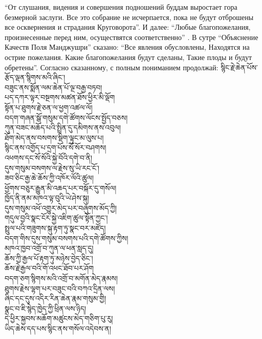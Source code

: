 “От слушания, видения и совершения подношений буддам выростает гора безмерной заслуги.
Все это собрание не исчерпается, пока не будут отброшены все осквернения и страдания Круговорота”.
И далее:
“Любые благопожелания, произнесенные перед ним, осуществятся соответственно” .
В сутре “Объяснение Качеств Поля Манджушри” сказано:
“Все явления обусловлены,
Находятся на острие пожелания.
Какие благопожелания будут сделаны,
Такие плоды и будут обретены”.
Согласно сказанному, с полным пониманием продолжай:
\normalsize
\newpage
\ti
སྙིང་རྗེ་ཆེན་པོས་རྩོད་ལྡན་སྙིགས་མའི་ཞིང་།\\
བཟུང་ནས་སྨོན་ལམ་ཆེན་པོ་ལྔ་བརྒྱ་བཏབ།\\
པད་དཀར་ལྟར་བསྔགས་མཚན་ཐོས་ཕྱིར་མི་ལྡོག\\
སྟོན་པ་ཐུགས་རྗེ་ཅན་ལ་ཕྱག་འཚལ་ལོ།\\
བདག་གཞན་སྒོ་གསུམ་དགེ་ཚོགས་ལོངས་སྤྱོད་བཅས།\\
ཀུན་བཟང་མཆོད་པའི་སྤྲིན་དུ་དམིགས་ནས་འབུལ།\\
ཐོག་མེད་ནས་བསགས་སྡིག་ལྟུང་མ་ལུས་པ། \\
སྙིང་ནས་འགྱོད་པ་དྲག་པོས་སོ་སོར་བཤགས།\\
འཕགས་དང་སོ་སོའི་སྐྱེ་བོའི་དགེ་བ་ནི།\\
དུས་གསུམ་བསགས་ལ་རྗེས་སུ་ཡི་རང་ངོ་།\\
ཟབ་ཅིང་རྒྱ་ཆེ་ཆོས་ཀྱི་འཁོར་ལོའི་ཚུལ། \\
ཕྱོགས་བཅུར་རྒྱུན་མི་འཆད་པར་བསྐོར་དུ་གསོལ།\\
ཁྱོད་ནི་ནམ་མཁའ་ལྟ་བུའི་ཡེ་ཤེས་སྐུ།\\
དུས་གསུམ་འཕོ་འགྱུར་མེད་པར་བཞུགས་མོད་ཀྱི།\\
གདུལ་བྱའི་སྣང་ངོར་སྐྱེ་འཇིག་ཚུལ་སྟོན་ཀྱང་།\\
སྤྲུལ་པའི་གཟུགས་སྐུ་རྟག་ཏུ་སྣང་བར་མཛོད།\\
བདག་གིས་དུས་གསུམ་བསགས་པའི་དགེ་ཚོགས་ཀྱིས། \\
མཁའ་ཁྱབ་འགྲོ་བ་ཀུན་ལ་ཕན་སླད་དུ། \\
ཆོས་ཀྱི་རྒྱལ་པོ་རྟག་ཏུ་མཉེས་བྱེད་ཅིང་།\\
ཆོས་རྗེ་རྒྱལ་བའི་གོ་འཕང་ཐོབ་པར་ཤོག\\
བདག་ཅག་སྙིགས་མའི་འགྲོ་བ་མགོན་མེད་རྣམས།\\
ཐུགས་རྗེས་ལྷག་པར་བཟུང་བའི་བཀའ་དྲིན་ལས།\\
ཞིང་དང་དུས་འདིར་རིན་ཆེན་རྣམ་གསུམ་གྱི། \\
སྣང་བ་ཇི་སྙེད་ཁྱེད་ཀྱི་ཕྲིན་ལས་ཉིད། \\
དེ་ཕྱིར་སྐྱབས་མཆོག་མཚུངས་མེད་གཅིག་པུ་རུ། \\
ཡིད་ཆེས་དད་པས་སྙིང་ནས་གསོལ་འདེབས་ན།\\
